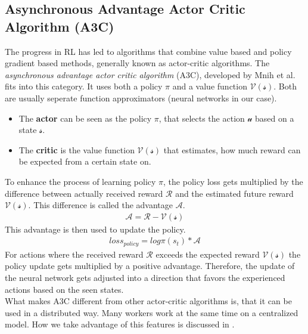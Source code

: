 \subsection*{Asynchronous Advantage Actor Critic Algorithm (A3C)}\label{a3c_intro}
The progress in RL has led to algorithms that combine value based and policy gradient based methods, generally known as actor-critic algorithms. The \textit{asynchronous advantage actor critic algorithm} (A3C), developed by Mnih et al. \cite{a3c} fits into this category. It uses both a policy $\pi$ and a value function $\mathcal{V(s)}$.
Both are usually seperate function approximators (neural networks in our case).
\begin{itemize}
	\item The \textbf{actor} can be seen as the policy $\pi$, that selects the action $\mathcal{u}$ based on a state $\mathcal{s}$.
	\item The \textbf{critic} is the value function $\mathcal{V(s)}$ that estimates, how much reward can be expected from a certain state on.
\end{itemize}
To enhance the process of learning policy $\pi$, the policy loss gets multiplied by the difference between actually received reward $\mathcal{R}$ and the estimated future reward $\mathcal{V(s)}$. This difference is called the advantage $\mathcal{A}$.
\begin{gather*}
\mathcal{A}=\mathcal{R}-\mathcal{V(s)}
\end{gather*}
This advantage is then used to update the policy.
\begin{gather*}
loss_{policy}=log \pi(s_{t})*\mathcal{A}
\end{gather*}
For actions where the received reward $\mathcal{R}$ exceeds the expected reward $\mathcal{V(s)}$ the policy update gets multiplied by a positive advantage. Therefore, the update of the neural network gets adjusted into a direction that favors the experienced actions based on the seen states.\\
What makes A3C different from other actor-critic algorithms is, that it can be used in a distributed way. Many workers work at the same time on a centralized model. How we take advantage of this features is discussed in .

